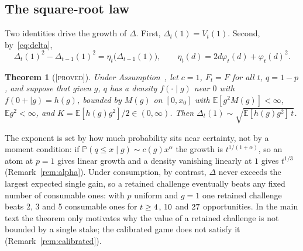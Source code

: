 \documentclass[aoas]{imsart}
\theoremstyle{plain}
\newtheorem{theorem}{Theorem}
\theoremstyle{definition}
\newcommand{\E}{\mathbb{E}}
\newcommand{\Prob}{\mathbb{P}}
\newcommand{\status}[1]{\textup{[\textsc{#1}]}}
\begin{document}
\subsection{The square-root law}
Two identities drive the growth of $\Delta$. First, $\Delta_t(1)=V_t(1)$. Second, by~\eqref{eq:delta},
\begin{equation}\label{eq:sqinc}
\Delta_t(1)^2-\Delta_{t-1}(1)^2 = \eta_t\bigl(\Delta_{t-1}(1)\bigr),\qquad \eta_t(d)=2d\varphi_t(d)+\varphi_t(d)^2 .
\end{equation}
\begin{theorem}[\status{proved}]\label{thm:sqrtS}
Under Assumption~, let $c=1$, $F_t=F$ for all $t$, $q=1-p$, and suppose that given $g$, $q$ has a
density $f(\cdot\mid g)$ near $0$ with $f(0+\mid g)=h(g)$, bounded by $M(g)$ on $[0,x_0]$ with $\E[g^2M(g)]<\infty$,
$\E g^2<\infty$, and $K=\E[h(g)g^2]/2\in(0,\infty)$. Then $\Delta_t(1)\sim\sqrt{\E[h(g)g^2]\,t}$.
\end{theorem}
\noindent The exponent is set by how much probability sits near certainty, not by a moment condition: if
$\Prob(q\le x\mid g)\sim c(g)x^\alpha$ the growth is $t^{1/(1+\alpha)}$, so an atom at $p=1$ gives linear growth and a
density vanishing linearly at $1$ gives $t^{1/3}$ (Remark~\ref{rem:alpha}). Under consumption, by contrast, $\Delta$
never exceeds the largest expected single gain, so a retained challenge eventually beats any fixed number of
consumable ones: with $p$ uniform and $g=1$ one retained challenge beats 2, 3 and 5 consumable ones for $t\ge4$,
$10$ and $27$ opportunities. In the main text the theorem only motivates why the value of a retained
challenge is not bounded by a single stake; the calibrated game does not satisfy it (Remark~\ref{rem:calibrated}).
\end{document}
